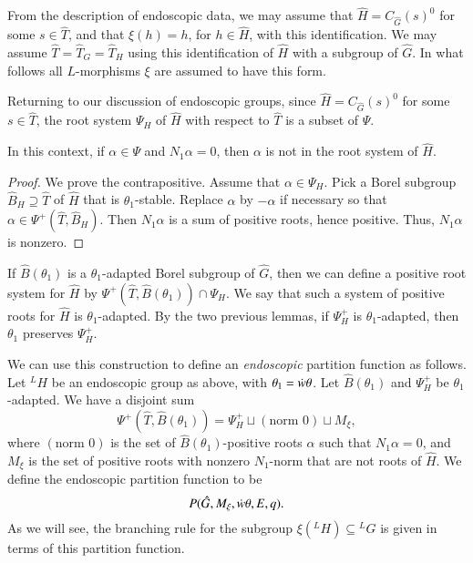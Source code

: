 From the description of endoscopic data, we may assume that $\hat H =
C_{\hat G}(s)^0$ for some $s\in \hat T$, and that $\xi(h) = h$, for $h
\in \hat H$, with this identification.  We may assume $\hat T = \hat
T_G = \hat T_H$ using this identification of $\hat H$ with a subgroup
of $\hat G$.  In what follows all $L$-morphisms $\xi$ are assumed
to have this form.

Returning to our discussion of endoscopic groups,
since $\hat H = C_{\hat G}(s)^0$ for some $s\in \hat T$, the root system $\Psi_H$
of $\hat H$
with respect to $\hat T$ is a subset of $\Psi$.

\begin{lemma} In this context,  if $\alpha\in \Psi$ and  $N_1\alpha=0$, then
$\alpha$ is not in the root system of $\hat H$.
\end{lemma}

\begin{proof} We prove the contrapositive.  Assume that $\alpha\in\Psi_H$.
Pick a Borel subgroup $\hat B_H\supseteq \hat T$ of $\hat H$ that
is $\theta_1$-stable.  Replace $\alpha$ by $-\alpha$ if necessary so that 
$\alpha\in\Psi^+(\hat T,\hat B_H)$.  Then $N_1\alpha$ is a sum of positive roots,
hence positive.  Thus, $N_1\alpha$ is nonzero.
\end{proof}

If $\hat B(\theta_1)$ is a $\theta_1$-adapted Borel subgroup of $\hat G$,
then we can define a positive root system for $\hat H$ by
$\Psi^+(\hat T,\hat B(\theta_1))\cap \Psi_H$.  We say that such a system of positive
roots for $\hat H$ is $\theta_1$-adapted.  By the two previous lemmas,
if $\Psi^+_H$ is $\theta_1$-adapted, then $\theta_1$ preserves $\Psi^+_H$.

We can use this construction to define an {\it endoscopic} partition function as follows.
Let ${}^LH$ be an endoscopic group
as above, with $\theta_1 = \dot w \theta$.
Let $\hat B(\theta_1)$ and $\Psi^+_H$ be $\theta_1$-adapted.  
We have a disjoint sum
\begin{equation}\label{eqn:disj-b1}
\Psi^+(\hat T,\hat B(\theta_1)) = \Psi^+_H \sqcup (\text{norm }  0) \sqcup M_\xi,
\end{equation}
where $(\text{norm } 0)$ is the set of $\hat B(\theta_1)$-positive roots $\alpha$ such that $N_1\alpha=0$,
and $M_\xi$ is the set of positive roots with nonzero $N_1$-norm that are not roots
of $\hat H$.
We define the endoscopic partition function to be
\begin{equation}\label{eqn:endo-partition}
P(\hat G,M_\xi,\dot w\theta,E,q).
\end{equation}
As we will see, the branching rule for the subgroup $\xi({}^LH)\subseteq {}^LG$ is
given in terms of this partition function.


